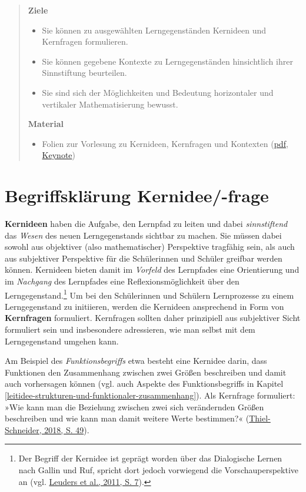 \documentclass[
]{scrbook}
\providecommand{\tightlist}{%
  \setlength{\itemsep}{0pt}\setlength{\parskip}{0pt}}
\theoremstyle{definition}
\theoremstyle{definition}
\theoremstyle{definition}
\theoremstyle{definition}
\theoremstyle{remark}
\begin{document}
\begin{quote}
\textbf{Ziele}

\begin{itemize}
\tightlist
\item
  Sie können zu ausgewählten Lerngegenständen Kernideen und Kernfragen formulieren.
\item
  Sie können gegebene Kontexte zu Lerngegenständen hinsichtlich ihrer Sinnstiftung beurteilen.
\item
  Sie sind sich der Möglichkeiten und Bedeutung horizontaler und vertikaler Mathematisierung bewusst.
\end{itemize}

\textbf{Material}

\begin{itemize}
\tightlist
\item
  Folien zur Vorlesung zu Kernideen, Kernfragen und Kontexten (\href{files/Stoffdidaktik-WiSe2223-Kap4.pdf}{pdf}, \href{files/Stoffdidaktik-WiSe2223-Kap4.key}{Keynote})
\end{itemize}
\end{quote}

\hypertarget{kernidee-begriffsklaerung}{%
\section{Begriffsklärung Kernidee/-frage}\label{kernidee-begriffsklaerung}}

\textbf{Kernideen} haben die Aufgabe, den Lernpfad zu leiten und dabei \emph{sinnstiftend} das \emph{Wesen} des neuen Lerngegenstands sichtbar zu machen. Sie müssen dabei sowohl aus objektiver (also mathematischer) Perspektive tragfähig sein, als auch aus subjektiver Perspektive für die Schülerinnen und Schüler greifbar werden können. Kernideen bieten damit im \emph{Vorfeld} des Lernpfades eine Orientierung und im \emph{Nachgang} des Lernpfades eine Reflexionsmöglichkeit über den Lerngegenstand.\footnote{Der Begriff der Kernidee ist geprägt worden über das Dialogische Lernen nach Gallin und Ruf, spricht dort jedoch vorwiegend die Vorschauperspektive an (vgl. \protect\hyperlink{ref-Leuders2011}{Leuders et al., 2011, S. 7}).} Um bei den Schülerinnen und Schülern Lernprozesse zu einem Lerngegenstand zu initiieren, werden die Kernideen ansprechend in Form von \textbf{Kernfragen} formuliert. Kernfragen sollten daher prinzipiell aus subjektiver Sicht formuliert sein und insbesondere adressieren, wie man selbst mit dem Lerngegenstand umgehen kann.

Am Beispiel des \emph{Funktionsbegriffs} etwa besteht eine Kernidee darin, dass Funktionen den Zusammenhang zwischen zwei Größen beschreiben und damit auch vorhersagen können (vgl. auch Aspekte des Funktionsbegriffs in Kapitel \ref{leitidee-strukturen-und-funktionaler-zusammenhang}). Als Kernfrage formuliert: »Wie kann man die Beziehung zwischen zwei sich verändernden Größen beschreiben und wie kann man damit weitere Werte bestimmen?« (\protect\hyperlink{ref-Thiel-Schneider2018}{Thiel-Schneider, 2018, S. 49}).
\end{document}
